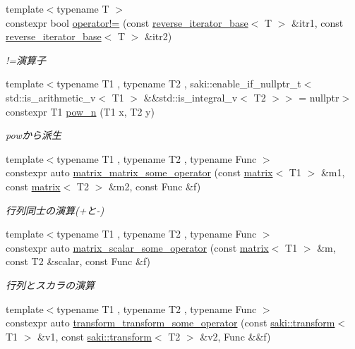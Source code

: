\begin{DoxyCompactItemize}
{\footnotesize template$<$typename T $>$ }\\constexpr bool \mbox{\hyperlink{namespacesaki_1_1details_a67a43f1e216aa1da9934815a21bfe2ee}{operator!=}} (const \mbox{\hyperlink{classsaki_1_1details_1_1reverse__iterator__base}{reverse\+\_\+iterator\+\_\+base}}$<$ T $>$ \&itr1, const \mbox{\hyperlink{classsaki_1_1details_1_1reverse__iterator__base}{reverse\+\_\+iterator\+\_\+base}}$<$ T $>$ \&itr2)
\begin{DoxyCompactList}\small\item\em !=演算子 \end{DoxyCompactList}\item 
{\footnotesize template$<$typename T1 , typename T2 , saki\+::enable\+\_\+if\+\_\+nullptr\+\_\+t$<$ std\+::is\+\_\+arithmetic\+\_\+v$<$ T1 $>$ \&\&std\+::is\+\_\+integral\+\_\+v$<$ T2 $>$$>$  = nullptr$>$ }\\constexpr T1 \mbox{\hyperlink{namespacesaki_1_1details_a30b4cd78c970618ee2886123c28e4041}{pow\+\_\+n}} (T1 x, T2 y)
\begin{DoxyCompactList}\small\item\em powから派生 \end{DoxyCompactList}\item 
{\footnotesize template$<$typename T1 , typename T2 , typename Func $>$ }\\constexpr auto \mbox{\hyperlink{namespacesaki_1_1details_a95cd387e134b1b940cde0b171926e01e}{matrix\+\_\+matrix\+\_\+some\+\_\+operator}} (const \mbox{\hyperlink{classsaki_1_1matrix}{matrix}}$<$ T1 $>$ \&m1, const \mbox{\hyperlink{classsaki_1_1matrix}{matrix}}$<$ T2 $>$ \&m2, const Func \&f)
\begin{DoxyCompactList}\small\item\em 行列同士の演算(+と-\/) \end{DoxyCompactList}\item 
{\footnotesize template$<$typename T1 , typename T2 , typename Func $>$ }\\constexpr auto \mbox{\hyperlink{namespacesaki_1_1details_aa3d3214e16ce99b6f4aca7d61d41077f}{matrix\+\_\+scalar\+\_\+some\+\_\+operator}} (const \mbox{\hyperlink{classsaki_1_1matrix}{matrix}}$<$ T1 $>$ \&m, const T2 \&scalar, const Func \&f)
\begin{DoxyCompactList}\small\item\em 行列とスカラの演算 \end{DoxyCompactList}\item 
{\footnotesize template$<$typename T1 , typename T2 , typename Func $>$ }\\constexpr auto \mbox{\hyperlink{namespacesaki_1_1details_a9cc45efebcefc4c153ed6ddd63de93f7}{transform\+\_\+transform\+\_\+some\+\_\+operator}} (const \mbox{\hyperlink{classsaki_1_1transform}{saki\+::transform}}$<$ T1 $>$ \&v1, const \mbox{\hyperlink{classsaki_1_1transform}{saki\+::transform}}$<$ T2 $>$ \&v2, Func \&\&f)

\end{DoxyCompactItemize}
